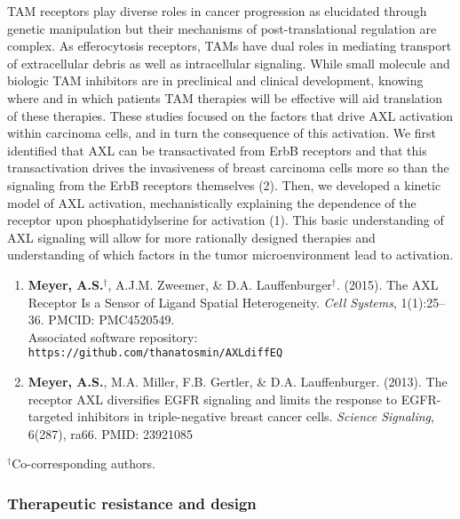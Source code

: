 \documentclass[11pt]{article}
\begin{document}
TAM receptors play diverse roles in cancer progression as elucidated through genetic manipulation but their mechanisms of post-translational regulation are complex. As efferocytosis receptors, TAMs have dual roles in mediating transport of extracellular debris as well as intracellular signaling. While small molecule and biologic TAM inhibitors are in preclinical and clinical development, knowing where and in which patients TAM therapies will be effective will aid translation of these therapies. These studies focused on the factors that drive AXL activation within carcinoma cells, and in turn the consequence of this activation. We first identified that AXL can be transactivated from ErbB receptors and that this transactivation drives the invasiveness of breast carcinoma cells more so than the signaling from the ErbB receptors themselves (2). Then, we developed a kinetic model of AXL activation, mechanistically explaining the dependence of the receptor upon phosphatidylserine for activation (1). This basic understanding of AXL signaling will allow for more rationally designed therapies and understanding of which factors in the tumor microenvironment lead to activation.

\begin{enumerate}
  \item \textbf{Meyer, A.S.}$^\dag$, A.J.M. Zweemer, \& D.A. Lauffenburger$^\dag$. (2015). The AXL Receptor Is a Sensor of Ligand Spatial Heterogeneity. \emph{Cell Systems}, 1(1):25--36. PMCID: PMC4520549.\\ Associated software repository: \texttt{https://github.com/thanatosmin/AXLdiffEQ}
  \item \textbf{Meyer, A.S.}, M.A. Miller, F.B. Gertler, \& D.A. Lauffenburger. (2013). The receptor AXL diversifies EGFR signaling and limits the response to EGFR-targeted inhibitors in triple-negative breast cancer cells. \emph{Science Signaling}, 6(287), ra66. PMID: 23921085
\end{enumerate}

\noindent $^\dag$Co-corresponding authors.






\subsubsection{Therapeutic resistance and design} %
\end{document}
